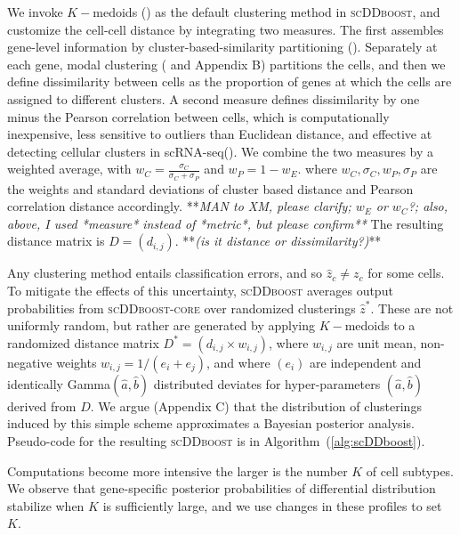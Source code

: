 \documentclass[11pt]{amsart}
\begin{document}
We invoke $K-$medoids (\cite{kmedoids}) 
as the default clustering method in \textsc{scDDboost}, and customize the cell-cell distance by integrating two measures.  
The first assembles gene-level information by cluster-based-similarity partitioning (\cite{ref:cspa}).
 Separately at each gene,   modal clustering (\cite{ref:dahl} and Appendix B) partitions the cells, and
then we define dissimilarity between cells as the proportion of genes at which the cells are assigned to different clusters. 
A second measure defines dissimilarity by one minus the 
Pearson correlation between cells, which is computationally inexpensive,
less sensitive to outliers than Euclidean distance, and effective at detecting cellular clusters in scRNA-seq(\cite{Cor}).
 We combine the two measures by a weighted average, 
with  $w_C = \frac{\sigma_C}{\sigma_C + \sigma_P}$ and $w_P = 1 - w_E$. where $w_C,\sigma_C, w_P, \sigma_P$ are the weights and standard deviations of cluster based distance and Pearson correlation distance accordingly.   
**{\em MAN to XM, please clarify; $w_E$ or $w_C$?; also, above, I used *measure* instead of *metric*, but please confirm**}
The resulting distance matrix is $D=\left( d_{i,j} \right)$. **{\em (is it distance or dissimilarity?)}**

Any clustering method  entails classification errors, and so $\hat z_c \neq z_c$ for some cells. To mitigate
the effects of this uncertainty, \textsc{scDDboost} averages output probabilities from \textsc{scDDboost-core} over
randomized clusterings $\hat z^*$.  These are not uniformly random, but rather are generated by applying $K-$medoids
to a randomized distance matrix $D^*=\left( d_{i,j}\times w_{i,j}\right)$, 
where $w_{i,j}$ are  unit mean, non-negative weights
$w_{i,j} = 1/( e_i + e_j )$, and where $( e_i) $ are independent and identically Gamma$(\hat a, \hat b)$ distributed
deviates for hyper-parameters $(\hat a, \hat b)$ derived from $D$.   We argue (Appendix C) that the distribution of
clusterings induced by this simple scheme approximates a Bayesian posterior analysis.   Pseudo-code for the resulting
\textsc{scDDboost} is in Algorithm~(\ref{alg:scDDboost}).

Computations become more intensive the larger is the number $K$ of cell subtypes.   We observe that gene-specific
posterior probabilities of differential distribution stabilize when $K$ is sufficiently large, and we use changes
in these profiles to set $K$.
\end{document}

